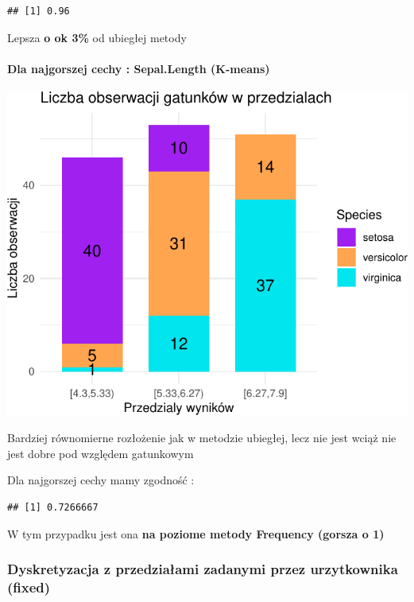 \documentclass[
  12pt,
]{article}
\begin{document}
\begin{verbatim}
## [1] 0.96
\end{verbatim}

Lepsza \textbf{o ok 3\%} od ubiegłej metody

\paragraph{Dla najgorszej cechy : Sepal.Length
(K-means)}\label{dla-najgorszej-cechy-sepal.length-k-means}

\begin{center}\includegraphics{Sprawozdanie2_files/figure-latex/tabela_kondygnacji_3_najg-1} \end{center}

Bardziej równomierne rozłożenie jak w metodzie ubiegłej, lecz nie jest
wciąż nie jest dobre pod względem gatunkowym

Dla najgorszej cechy mamy zgodność :

\begin{verbatim}
## [1] 0.7266667
\end{verbatim}

W tym przypadku jest ona \textbf{na poziome metody Frequency (gorsza o
1)}

\subsubsection{Dyskretyzacja z przedziałami zadanymi przez urzytkownika
(fixed)}\label{dyskretyzacja-z-przedziaux142ami-zadanymi-przez-urzytkownika-fixed}
\end{document}
